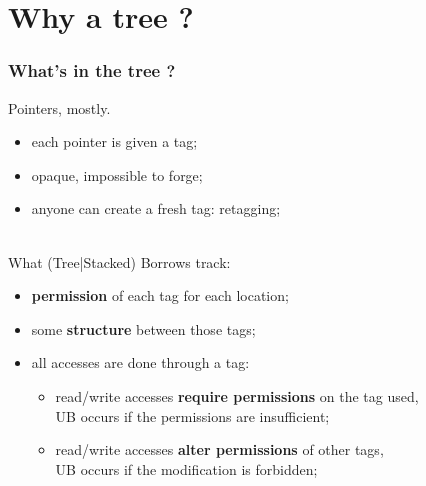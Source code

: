 \section{Why a tree ?}

\begin{frame}
    \frametitle{What's in the tree ?}
    Pointers, mostly.

    \begin{itemize}
        \item each pointer is given a tag;
        \item opaque, impossible to forge;
        \item anyone can create a fresh tag: retagging;
    \end{itemize}
    ~\\
    What (Tree|Stacked) Borrows track:
    \begin{itemize}
        \item \textbf{permission} of each tag for each location;
        \item some \textbf{structure} between those tags;
        \item all accesses are done through a tag:
            \begin{itemize}
                \item read/write accesses \textbf{require permissions} on the tag used,\\
                    UB occurs if the permissions are insufficient;
                \item read/write accesses \textbf{alter permissions} of other tags,\\
                    UB occurs if the modification is forbidden;
            \end{itemize}
    \end{itemize}
\end{frame}

